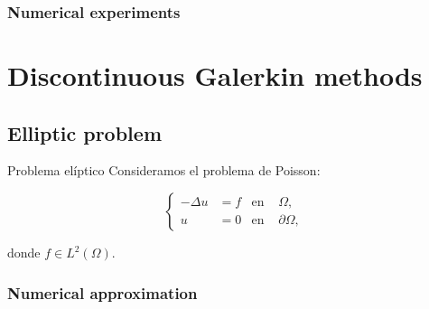 \subsubsection{Numerical experiments}

\section{Discontinuous Galerkin methods}

	\subsection{Elliptic problem}

	\begin{frame}{Problema elíptico}
		Consideramos el problema de Poisson:
		\begin{block}{}
		\begin{equation*}
		\label{prob_modelo_Poisson}
		\left\{
		\begin{aligned}
		-\Delta u&=f & \text{en } &\Omega, \\
		u&=0 & \text{en } &\partial\Omega,
		\end{aligned}
		\right.
		\end{equation*}
		\end{block}
		donde $f\in L^2\left(\Omega\right)$.
		\end{frame}

	\subsubsection{Numerical approximation}

